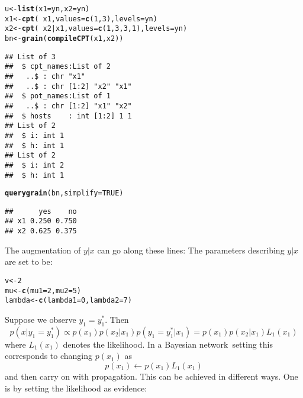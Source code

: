 \documentclass[10pt]{article}\usepackage[]{graphicx}\usepackage[]{xcolor}
\makeatletter
\newcommand{\hlnum}[1]{\textcolor[rgb]{0.686,0.059,0.569}{#1}}%
\newcommand{\hlopt}[1]{\textcolor[rgb]{0,0,0}{#1}}%
\newcommand{\hlstd}[1]{\textcolor[rgb]{0.345,0.345,0.345}{#1}}%
\newcommand{\hlkwb}[1]{\textcolor[rgb]{0.69,0.353,0.396}{#1}}%
\newcommand{\hlkwc}[1]{\textcolor[rgb]{0.333,0.667,0.333}{#1}}%
\newcommand{\hlkwd}[1]{\textcolor[rgb]{0.737,0.353,0.396}{\textbf{#1}}}%
\newenvironment{kframe}{%
 \def\at@end@of@kframe{}%
 \ifinner\ifhmode%
  \def\at@end@of@kframe{\end{minipage}}%
  \begin{minipage}{\columnwidth}%
 \fi\fi%
 \def\FrameCommand##1{\hskip\@totalleftmargin \hskip-\fboxsep
 \colorbox{shadecolor}{##1}\hskip-\fboxsep
     \hskip-\linewidth \hskip-\@totalleftmargin \hskip\columnwidth}%
 \MakeFramed {\advance\hsize-\width
   \@totalleftmargin\z@ \linewidth\hsize
   \@setminipage}}%
 {\par\unskip\endMakeFramed%
 \at@end@of@kframe}
\newenvironment{knitrout}{}{} %
\def\bn{Bayesian network}
\makeatother
\begin{document}
\begin{knitrout}
\color{fgcolor}\begin{kframe}
\begin{alltt}
\hlstd{u} \hlkwb{<-} \hlkwd{list}\hlstd{(}\hlkwc{x1}\hlstd{=yn,} \hlkwc{x2}\hlstd{=yn)}
\hlstd{x1} \hlkwb{<-} \hlkwd{cpt}\hlstd{(}\hlopt{~}\hlstd{x1,} \hlkwc{values}\hlstd{=}\hlkwd{c}\hlstd{(}\hlnum{1}\hlstd{,} \hlnum{3}\hlstd{),} \hlkwc{levels}\hlstd{=yn)}
\hlstd{x2} \hlkwb{<-} \hlkwd{cpt}\hlstd{(}\hlopt{~}\hlstd{x2}\hlopt{|}\hlstd{x1,} \hlkwc{values}\hlstd{=}\hlkwd{c}\hlstd{(}\hlnum{1}\hlstd{,} \hlnum{3}\hlstd{,} \hlnum{3}\hlstd{,} \hlnum{1}\hlstd{),} \hlkwc{levels}\hlstd{=yn)}
\hlstd{bn} \hlkwb{<-} \hlkwd{grain}\hlstd{(}\hlkwd{compileCPT}\hlstd{(x1, x2))}
\end{alltt}
\begin{verbatim}
## List of 3
##  $ cpt_names:List of 2
##   ..$ : chr "x1"
##   ..$ : chr [1:2] "x2" "x1"
##  $ pot_names:List of 1
##   ..$ : chr [1:2] "x1" "x2"
##  $ hosts    : int [1:2] 1 1
## List of 2
##  $ i: int 1
##  $ h: int 1
## List of 2
##  $ i: int 2
##  $ h: int 1
\end{verbatim}
\begin{alltt}
\hlkwd{querygrain}\hlstd{(bn,} \hlkwc{simplify}\hlstd{=}\hlnum{TRUE}\hlstd{)}
\end{alltt}
\begin{verbatim}
##      yes    no
## x1 0.250 0.750
## x2 0.625 0.375
\end{verbatim}
\end{kframe}
\end{knitrout}

The augmentation of $y|x$ can go along these lines: The parameters describing $y|x$ are set to be:
\begin{knitrout}
\color{fgcolor}\begin{kframe}
\begin{alltt}
\hlstd{v} \hlkwb{<-} \hlnum{2}
\hlstd{mu} \hlkwb{<-} \hlkwd{c}\hlstd{(}\hlkwc{mu1}\hlstd{=}\hlnum{2}\hlstd{,} \hlkwc{mu2}\hlstd{=}\hlnum{5}\hlstd{)}
\hlstd{lambda} \hlkwb{<-} \hlkwd{c}\hlstd{(}\hlkwc{lambda1}\hlstd{=}\hlnum{0}\hlstd{,} \hlkwc{lambda2}\hlstd{=}\hlnum{7}\hlstd{)}
\end{alltt}
\end{kframe}
\end{knitrout}

Suppose we observe $y_1 = y_1^*$. Then
\begin{displaymath}
  p(x|y_1= y_1^*)\propto p(x_1)p(x_2|x_1) p(y_1=y_1^*|x_1) =  p(x_1)p(x_2|x_1) L_1(x_1)
\end{displaymath}
where $L_1(x_1)$ denotes the likelihood. In a \bn\ setting this
corresponds to changing $p(x_1)$ as
\begin{displaymath}
  p(x_1) \leftarrow p(x_1)L_1(x_1)
\end{displaymath}
and then carry on with propagation. This can be achieved in different ways. One is by setting the likelihood as evidence:
\end{document}
